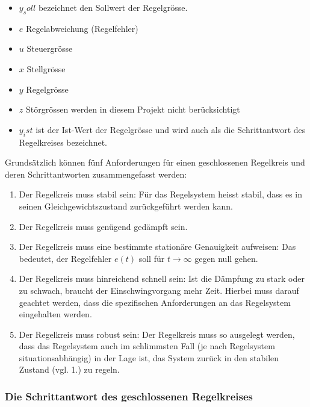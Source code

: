 \begin{itemize}
    \item
        $y_soll$ bezeichnet den Sollwert der Regelgr\"osse.
    \item
        $e$ Regelabweichung (Regelfehler)
    \item
        $u$ Steuergr\"osse
    \item
        $x$ Stellgr\"osse
    \item
        $y$ Regelgr\"osse
    \item
        $z$ St\"orgr\"ossen werden in diesem Projekt nicht ber\"ucksichtigt
    \item
        $y_ist$  ist der  Ist-Wert der  Regelgr\"osse  und wird  auch als  die
        Schrittantwort des Regelkreises bezeichnet.
\end{itemize}


Grunds\"atzlich k\"onnen f\"unf Anforderungen f\"ur einen geschlossenen
Regelkreis und deren Schrittantworten zusammengefasst werden:
\begin{enumerate}
    \item
        Der Regelkreis muss stabil sein:  F\"ur das Regelsystem heisst stabil,
        dass es in seinen Gleichgewichtszustand zur\"uckgef\"uhrt werden kann.
    \item
        Der Regelkreis muss gen\"ugend ged\"ampft sein.
    \item
        Der   Regelkreis   muss   eine  bestimmte   station\"are   Genauigkeit
        aufweisen: Das   bedeutet,   der   Regelfehler   $e(t)$   soll   f\"ur
        $t\rightarrow\infty$ gegen null gehen.
    \item
        Der  Regelkreis muss  hinreichend  schnell sein:   Ist die  D\"ampfung
        zu  stark   oder  zu  schwach,  braucht   der  Einschwingvorgang  mehr
        Zeit. Hierbei  muss  darauf  geachtet werden,  dass  die  spezifischen
        Anforderungen an das Regelsystem eingehalten werden.
    \item
        Der  Regelkreis muss  robust  sein: Der Regelkreis  muss so  ausgelegt
        werden,  dass  das  Regelsystem  auch im  schlimmsten  Fall  (je  nach
        Regelsystem situationsabh\"angig) in der Lage ist, das System zur\"uck
        in den stabilen Zustand (vgl. 1.) zu regeln.
\end{enumerate}

\subsubsection{Die Schrittantwort des geschlossenen Regelkreises}

